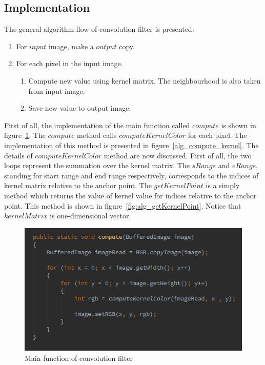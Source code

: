 \documentclass{article}
\begin{document}
\subsection{Implementation}

The general algorithm flow of convolution filter is presented:
 
\begin{enumerate}
	\item For $input$ image, make a $output$ copy.
	\item For each pixel in the input image.
	\begin{enumerate}	
		\item Compute new value using kernel matrix. The neighbourhood is also taken from input image.
		\item Save new value to output image.
	\end{enumerate}
\end{enumerate}


First of all, the implementation of the main function called $compute$ is shown in figure~\ref{fig:alg_compute}. The $compute$ method calls $computeKernelColor$ for each pixel. The implementation of this method is presented in figure~\ref{alg_compute_kernel}. The details of $computeKernelColor$ method are now discussed. First of all, the two loops represent the summation over the kernel matrix. The $sRange$ and $eRange$, standing for start range and end range respectively, corresponds to the indices of kernel matrix relative to the anchor point. The $getKernelPoint$ is a simply method which returns the value of kernel value for indices relative to the anchor point. This method is shown in figure~\ref{fig:alg_getKernelPoint}. Notice that $kernelMatrix$ is one-dimensional vector.



\begin{figure}[H]
\centering

  \includegraphics[width=0.9\linewidth]{res/algorithms/compute.png}
  
\caption{Main function of convolution filter}
\label{fig:alg_compute}
\end{figure}
\end{document}
